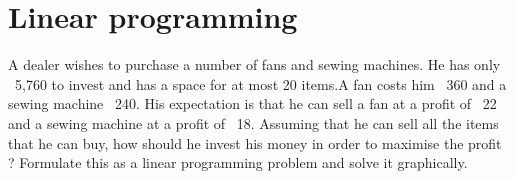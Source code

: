 \documentclass{article}
\begin{document}
\section*{Linear programming}
A dealer wishes to purchase a number of fans and sewing machines. He has only \rupee~5,760 to invest and has a space for at most 20 items.A fan costs him \rupee~360 and a sewing machine \rupee~240. His expectation is that he can sell a fan at a profit of \rupee~22 and a sewing machine at a profit of \rupee~18. Assuming that he can sell all the items that he can buy, how should he invest his money in order to maximise the profit ? Formulate this as a linear programming problem and solve it graphically.
\end{document}

